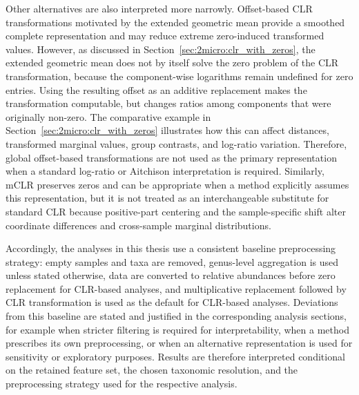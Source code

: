 Other alternatives are also interpreted more narrowly. Offset-based CLR transformations motivated by the extended geometric mean provide a smoothed complete representation and may reduce extreme zero-induced transformed values. However, as discussed in Section~\ref{sec:2micro:clr_with_zeros}, the extended geometric mean does not by itself solve the zero problem of the CLR transformation, because the component-wise logarithms remain undefined for zero entries. Using the resulting offset as an additive replacement makes the transformation computable, but changes ratios among components that were originally non-zero. The comparative example in Section~\ref{sec:2micro:clr_with_zeros} illustrates how this can affect distances, transformed marginal values, group contrasts, and log-ratio variation. Therefore, global offset-based transformations are not used as the primary representation when a standard log-ratio or Aitchison interpretation is required. Similarly, mCLR preserves zeros and can be appropriate when a method explicitly assumes this representation, but it is not treated as an interchangeable substitute for standard CLR because positive-part centering and the sample-specific shift alter coordinate differences and cross-sample marginal distributions.

Accordingly, the analyses in this thesis use a consistent baseline preprocessing strategy: empty samples and taxa are removed, genus-level aggregation is used unless stated otherwise, data are converted to relative abundances before zero replacement for CLR-based analyses, and multiplicative replacement followed by CLR transformation is used as the default for CLR-based analyses. Deviations from this baseline are stated and justified in the corresponding analysis sections, for example when stricter filtering is required for interpretability, when a method prescribes its own preprocessing, or when an alternative representation is used for sensitivity or exploratory purposes. Results are therefore interpreted conditional on the retained feature set, the chosen taxonomic resolution, and the preprocessing strategy used for the respective analysis.
